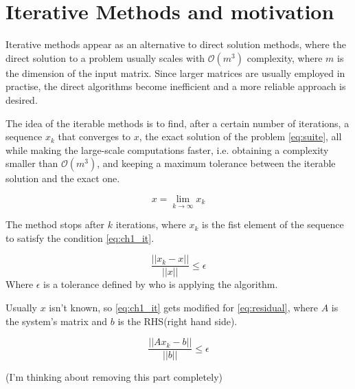 \section{Iterative Methods and motivation}


Iterative methods appear as an alternative to direct solution methods, where the direct solution to a problem usually scales with $\mathcal{O}(m^{3})$ complexity, where $m$ is the dimension of the input matrix. Since larger matrices are usually employed in practise, the direct algorithms become inefficient and a more reliable approach is desired.


The idea of the iterable methods is to find, after a certain number of iterations, a sequence ${x_{k}}$ that converges to $x$, the exact solution of the problem \ref{eq:suite}, all while making the large-scale computations faster, i.e. obtaining a complexity smaller than $\mathcal{O}(m^{3})$, and keeping a maximum tolerance between the iterable solution and the exact one.


\begin{equation}\label{eq:suite}
    x = \lim_{k \to \infty} x_{k}
\end{equation}


The method stops after $k$ iterations, where $x_{k}$ is the fist element of the sequence to satisfy the condition \ref{eq:ch1_it}.


\begin{equation}\label{eq:ch1_it}
    \frac{||x_{k} - x||}{||x||} \leq \epsilon
\end{equation}
Where $\epsilon$ is a tolerance defined by who is applying the algorithm.

Usually $x$ isn't known, so \ref{eq:ch1_it} gets modified for \ref{eq:residual}, where $A$ is the system's matrix and $b$ is the RHS(right hand side).

\begin{equation}\label{eq:residual}
    \frac{||Ax_{k} - b||}{||b||} \leq \epsilon
\end{equation}

(I'm thinking about removing this part completely)

